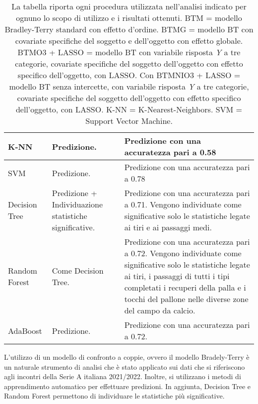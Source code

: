 \begin{table}[]
\begin{longtable}{|C{0.18\textwidth}|C{0.3\textwidth}|C{0.5\textwidth}|}
	K-NN & Predizione. & Predizione con una accuratezza pari a 0.58\\
	\hline	
	SVM & Predizione. & Predizione con una accuratezza pari a 0.78\\
	\hline	
	Decision Tree & Predizione + Individuazione statistiche significative. & Predizione con una accuratezza pari a 0.71. Vengono individuate come significative solo le statistiche legate ai tiri e ai passaggi medi.\\
	\hline	
	Random Forest & Come Decision Tree. & Predizione con una accuratezza pari a 0.72. Vengono individuate come significative solo le statistiche legate ai tiri, i passaggi di tutti i tipi completati i recuperi della palla e i tocchi del pallone nelle diverse zone del campo da calcio. \\
	\hline	
	AdaBoost & Predizione. & Predizione con una accuratezza pari a 0.72. \\
	\hline
\end{longtable}	
\vspace*{5mm}

\caption{La tabella riporta ogni procedura utilizzata nell'analisi indicato per ognuno lo scopo di utilizzo e i risultati ottenuti. BTM = modello Bradley-Terry standard con effetto d'ordine. BTMG = modello BT con covariate specifiche del soggetto e dell'oggetto con effetto globale. BTMO3 + LASSO = modello BT con variabile risposta \emph{Y} a tre categorie, covariate specifiche del soggetto dell'oggetto con effetto specifico dell'oggetto, con LASSO. Con BTMNIO3 + LASSO = modello BT senza intercette, con variabile risposta \emph{Y} a tre categorie, covariate specifiche del soggetto dell'oggetto con effetto specifico dell'oggetto, con LASSO. K-NN = K-Nearest-Neighbors. SVM = Support Vector Machine.} \label{tab:fine}

\end{table}
L'utilizzo di un modello di confronto a coppie, ovvero il modello Bradely-Terry è un naturale strumento di analisi che è stato applicato sui dati che si riferiscono agli incontri della Serie A italiana 2021/2022. 
Inoltre, si utilizzano i metodi di apprendimento automatico per effettuare predizioni. In aggiunta, Decision Tree e Random Forest permettono di individuare le statistiche più significative. \\
